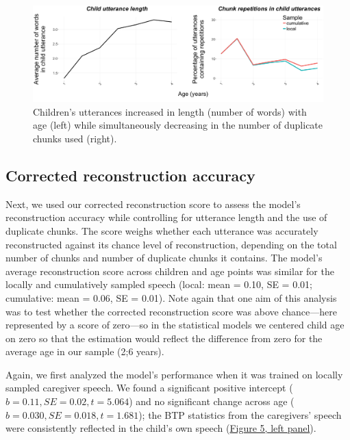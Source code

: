 \documentclass[man,mask,floatsintext]{apa6}
\theoremstyle{definition}
\theoremstyle{definition}
\theoremstyle{definition}
\theoremstyle{remark}
\begin{document}
\begin{figure}

{\centering \includegraphics[width=0.95\linewidth]{images/plotbothfactors} 

}

\caption{Children's utterances increased in length (number of words) with age (left) while simultaneously decreasing in the number of duplicate chunks used (right).}\label{fig:fig4}
\end{figure}

\subsection{Corrected reconstruction
accuracy}\label{corrected-reconstruction-accuracy-1}

Next, we used our corrected reconstruction score to assess the model's
reconstruction accuracy while controlling for utterance length and the
use of duplicate chunks. The score weighs whether each utterance was
accurately reconstructed against its chance level of reconstruction,
depending on the total number of chunks and number of duplicate chunks
it contains. The model's average reconstruction score across children
and age points was similar for the locally and cumulatively sampled
speech (local: mean = 0.10, SE = 0.01; cumulative: mean = 0.06, SE =
0.01). Note again that one aim of this analysis was to test whether the
corrected reconstruction score was above chance---here represented by a
score of zero---so in the statistical models we centered child age on
zero so that the estimation would reflect the difference from zero for
the average age in our sample (2;6 years).

Again, we first analyzed the model's performance when it was trained on
locally sampled caregiver speech. We found a significant positive
intercept (\(b = 0.11, SE = 0.02, t = 5.064\)) and no significant change
across age (\(b = 0.030, SE = 0.018, t = 1.681\)); the BTP statistics
from the caregivers' speech were consistently reflected in the child's
own speech (\protect\hyperlink{fig5}{Figure 5, left panel}).
\end{document}

